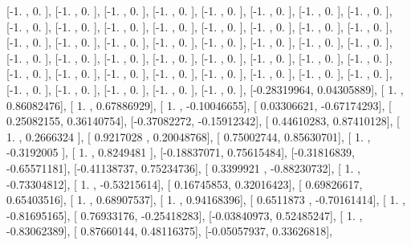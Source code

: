 \documentclass{article}
\begin{document}
       [-1.        ,  0.        ],
       [-1.        ,  0.        ],
       [-1.        ,  0.        ],
       [-1.        ,  0.        ],
       [-1.        ,  0.        ],
       [-1.        ,  0.        ],
       [-1.        ,  0.        ],
       [-1.        ,  0.        ],
       [-1.        ,  0.        ],
       [-1.        ,  0.        ],
       [-1.        ,  0.        ],
       [-1.        ,  0.        ],
       [-1.        ,  0.        ],
       [-1.        ,  0.        ],
       [-1.        ,  0.        ],
       [-1.        ,  0.        ],
       [-1.        ,  0.        ],
       [-1.        ,  0.        ],
       [-1.        ,  0.        ],
       [-1.        ,  0.        ],
       [-1.        ,  0.        ],
       [-1.        ,  0.        ],
       [-1.        ,  0.        ],
       [-1.        ,  0.        ],
       [-1.        ,  0.        ],
       [-1.        ,  0.        ],
       [-1.        ,  0.        ],
       [-1.        ,  0.        ],
       [-1.        ,  0.        ],
       [-1.        ,  0.        ],
       [-1.        ,  0.        ],
       [-1.        ,  0.        ],
       [-1.        ,  0.        ],
       [-1.        ,  0.        ],
       [-1.        ,  0.        ],
       [-1.        ,  0.        ],
       [-1.        ,  0.        ],
       [-1.        ,  0.        ],
       [-1.        ,  0.        ],
       [-1.        ,  0.        ],
       [-1.        ,  0.        ],
       [-1.        ,  0.        ],
       [-1.        ,  0.        ],
       [-1.        ,  0.        ],
       [-1.        ,  0.        ],
       [-0.28319964,  0.04305889],
       [ 1.        ,  0.86082476],
       [ 1.        ,  0.67886929],
       [ 1.        , -0.10046655],
       [ 0.03306621, -0.67174293],
       [ 0.25082155,  0.36140754],
       [-0.37082272, -0.15912342],
       [ 0.44610283,  0.87410128],
       [ 1.        ,  0.2666324 ],
       [ 0.9217028 ,  0.20048768],
       [ 0.75002744,  0.85630701],
       [ 1.        , -0.3192005 ],
       [ 1.        ,  0.8249481 ],
       [-0.18837071,  0.75615484],
       [-0.31816839, -0.65571181],
       [-0.41138737,  0.75234736],
       [ 0.3399921 , -0.88230732],
       [ 1.        , -0.73304812],
       [ 1.        , -0.53215614],
       [ 0.16745853,  0.32016423],
       [ 0.69826617,  0.65403516],
       [ 1.        ,  0.68907537],
       [ 1.        ,  0.94168396],
       [ 0.6511873 , -0.70161414],
       [ 1.        , -0.81695165],
       [ 0.76933176, -0.25418283],
       [-0.03840973,  0.52485247],
       [ 1.        , -0.83062389],
       [ 0.87660144,  0.48116375],
       [-0.05057937,  0.33626818],
\end{document}
